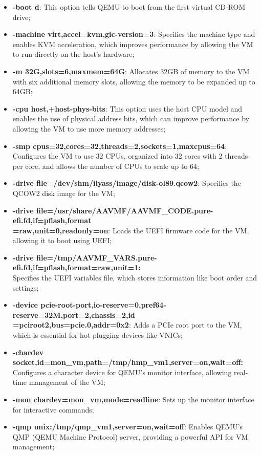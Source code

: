 \begin{itemize}
    \item \textbf{-boot d}: This option tells QEMU to boot from the first virtual CD-ROM drive;
    \item \textbf{-machine virt,accel=kvm,gic-version=3}: Specifies the machine type and enables KVM acceleration, which improves performance by allowing the VM to run directly on the host's hardware;
    \item \textbf{-m 32G,slots=6,maxmem=64G}: Allocates 32GB of memory to the VM with six additional memory slots, allowing the memory to be expanded up to 64GB;
    \item \textbf{-cpu host,+host-phys-bits}: This option uses the host CPU model and enables the use of physical address bits, which can improve performance by allowing the VM to use more memory addresses;
    \item \textbf{-smp cpus=32,cores=32,threads=2,sockets=1,maxcpus=64}: Configures the VM to use 32 CPUs, organized into 32 cores with 2 threads per core, and allows the number of CPUs to scale up to 64;
    \item \textbf{-drive file=/dev/shm/ilyass/image/disk-ol89.qcow2}: Specifies the QCOW2 disk image for the VM;
    \item \textbf{-drive file=/usr/share/AAVMF/AAVMF\_CODE.pure-efi.fd,if=pflash,format\\=raw,unit=0,readonly=on}: Loads the UEFI firmware code for the VM, allowing it to boot using UEFI;
    \item \textbf{-drive file=/tmp/AAVMF\_VARS.pure-efi.fd,if=pflash,format=raw,unit=1:\\} Specifies the UEFI variables file, which stores information like boot order and settings;
    \item \textbf{-device pcie-root-port,io-reserve=0,pref64-reserve=32M,port=2,chassis=2,id\\=pciroot2,bus=pcie.0,addr=0x2}: Adds a PCIe root port to the VM, which is essential for hot-plugging devices like VNICs;
    \item \textbf{-chardev socket,id=mon\_vm,path=/tmp/hmp\_vm1,server=on,wait=off:\\} Configures a character device for QEMU’s monitor interface, allowing real-time management of the VM;
    \item \textbf{-mon chardev=mon\_vm,mode=readline}: Sets up the monitor interface for interactive commands;
    \item \textbf{-qmp unix:/tmp/qmp\_vm1,server=on,wait=off}: Enables QEMU’s QMP (QEMU Machine Protocol) server, providing a powerful API for VM management;

\end{itemize}
